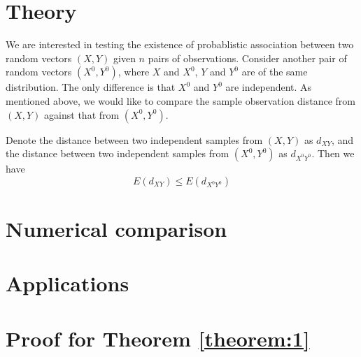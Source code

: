 \documentclass{sig-alternate}
\begin{document}
\section{Theory}
\label{sec:funcs}


We are interested in testing the existence of probablistic association
between two random vectors $(X,Y)$ given $n$ pairs of observations.
Consider another pair of random vectors $(X^0, Y^0)$, where $X$ and
$X^0$, $Y$ and $Y^0$ are of the same distribution. The only difference
is that $X^0$ and $Y^0$ are independent. As mentioned above, we would
like to compare the sample observation distance from $(X,Y)$ against
that from $(X^0,Y^0)$. 

\begin{theorem}
  \label{theorem:1}
  Denote the distance between two independent samples from $(X,Y)$ as
  $d_{XY}$, and the distance between two independent samples from
  $(X^0,Y^0)$ as $d_{X^0Y^0}$. Then we have 
  \begin{displaymath}
    E(d_{XY}) \le E(d_{X^0Y^0})
  \end{displaymath}
\end{theorem}









\section{Numerical comparison}
\label{sec:comparison}

\section{Applications}
\label{sec:haha}



\appendix{}

\section{Proof for Theorem \ref{theorem:1}}
\label{sec:proof-1}







\end{document}
